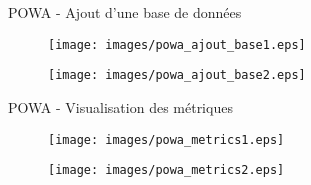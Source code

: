
\begin{frame}{POWA - Ajout d'une base de données}

\begin{figure}
\begin{center}
\texttt{[image: images/powa\_ajout\_base1.eps]}
\end{center}
\end{figure}

\begin{figure}
\begin{center}
\texttt{[image: images/powa\_ajout\_base2.eps]}
\end{center}
\end{figure}


\end{frame}


\begin{frame}{POWA - Visualisation des métriques}

\begin{figure}
\begin{center}
\texttt{[image: images/powa\_metrics1.eps]}
\end{center}
\end{figure}

\begin{figure}
\begin{center}
\texttt{[image: images/powa\_metrics2.eps]}
\end{center}
\end{figure}

\end{frame}


